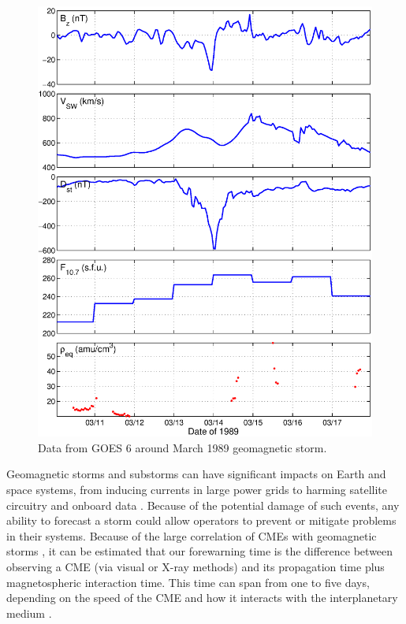 \begin{figure}[htp!]
	\centering
	\includegraphics[width=1\linewidth]{Figures/alldata-GOES6-10Mar1989-17Mar1989.eps}%
	\caption{Data from GOES 6 around March 1989 geomagnetic storm.}
	\label{fig:alldata-GOES6-1989-1989}
\end{figure}



Geomagnetic storms and substorms can have significant impacts on Earth and space systems, from inducing currents in large power grids to harming satellite circuitry and onboard data \citep{1989Storm}. Because of the potential damage of such events, any ability to forecast a storm could allow operators to prevent or mitigate problems in their systems. Because of the large correlation of CMEs with geomagnetic storms \citep{Yermolaev}, it can be estimated that our forewarning time is the difference between observing a CME (via visual or X-ray methods) and its propagation time plus magnetospheric interaction time. This time can span from one to five days, depending on the speed of the CME and how it interacts with the interplanetary medium \citep{StormSources}. 

